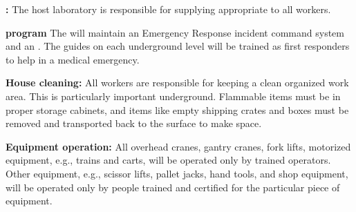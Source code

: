 {\bf {}:} 
The host laboratory is responsible for supplying appropriate  to all workers. 

{\bf {} program} The  will maintain an Emergency Response incident command system and an .  The guides on each underground level will be trained as first responders to help in a medical emergency.
  
  
  {\bf House cleaning:} All workers are responsible for keeping a clean organized work area. This is particularly important underground. Flammable items must be in proper storage cabinets, and items like empty shipping crates and boxes must be removed and 
transported back to the surface to make space.


{\bf Equipment operation:} All overhead cranes, gantry cranes, fork lifts, motorized equipment, e.g., trains and carts, will be operated only by trained  operators. 
Other equipment, e.g., scissor lifts, pallet jacks, hand tools, and shop equipment, will be operated only by people trained
and certified for the particular piece of equipment.
